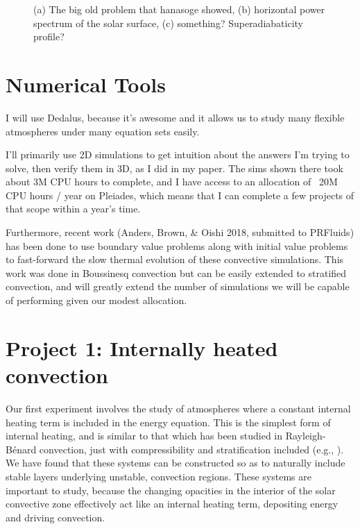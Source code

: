 \documentclass[aasms,12pt]{article}
\newcommand{\RB}{Rayleigh-B\'{e}nard }
\begin{document}
\begin{figure}[t!]
\centering
\caption{(a) The big old problem that hanasoge showed, (b) horizontal power spectrum of the
solar surface, (c) something? Superadiabaticity profile?
        \label{fig:fig1}}
\end{figure}

\section{Numerical Tools}
I will use Dedalus, because it's awesome and it allows us to study many flexible atmospheres
under many equation sets easily.

I'll primarily use 2D simulations to get intuition about the answers I'm trying to solve,
then verify them in 3D, as I did in my paper.  The sims shown there took about 3M CPU hours
to complete, and I have access to an allocation of ~20M CPU hours / year on Pleiades, which
means that I can complete a few projects of that scope within a year's time.

Furthermore, recent work (Anders, Brown, \& Oishi 2018, submitted to PRFluids) has been
done to use boundary value problems along with initial value problems to fast-forward
the slow thermal evolution of these convective simulations.  This work was done in 
Boussinesq convection but can be easily extended to stratified convection, and will greatly
extend the number of simulations we will be capable of performing given our modest allocation.


\section{Project 1: Internally heated convection}
Our first experiment involves the study of atmospheres where a constant internal heating
term is included in the energy equation.  This is the simplest form of internal heating,
and is similar to that which has been studied in \RB convection, just with compressibility
and stratification included (e.g., \citealt{goluskin&spiegel2012}).  
We have found that these systems can be constructed so as to
naturally include stable layers underlying unstable, convection regions.  These systems
are important to study, because the changing opacities in the interior of the solar convective
zone effectively act like an internal heating term, depositing energy and driving convection.
\end{document}
